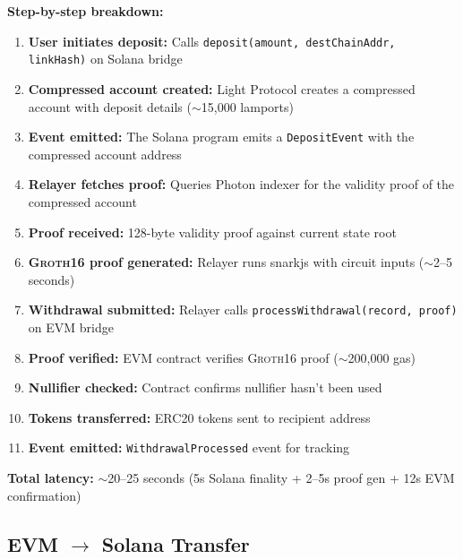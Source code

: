\documentclass[11pt,a4paper,twoside]{article}
\newcommand{\groth}{\textsc{Groth16}}
\begin{document}
\textbf{Step-by-step breakdown:}
\begin{enumerate}
    \item \textbf{User initiates deposit:} Calls \texttt{deposit(amount, destChainAddr, linkHash)} on Solana bridge
    \item \textbf{Compressed account created:} Light Protocol creates a compressed account with deposit details ($\sim$15,000 lamports)
    \item \textbf{Event emitted:} The Solana program emits a \texttt{DepositEvent} with the compressed account address
    \item \textbf{Relayer fetches proof:} Queries Photon indexer for the validity proof of the compressed account
    \item \textbf{Proof received:} 128-byte validity proof against current state root
    \item \textbf{\groth{} proof generated:} Relayer runs snarkjs with circuit inputs ($\sim$2--5 seconds)
    \item \textbf{Withdrawal submitted:} Relayer calls \texttt{processWithdrawal(record, proof)} on EVM bridge
    \item \textbf{Proof verified:} EVM contract verifies \groth{} proof ($\sim$200,000 gas)
    \item \textbf{Nullifier checked:} Contract confirms nullifier hasn't been used
    \item \textbf{Tokens transferred:} ERC20 tokens sent to recipient address
    \item \textbf{Event emitted:} \texttt{WithdrawalProcessed} event for tracking
\end{enumerate}

\textbf{Total latency:} $\sim$20--25 seconds (5s Solana finality + 2--5s proof gen + 12s EVM confirmation)

\subsection{EVM $\rightarrow$ Solana Transfer}
\end{document}
